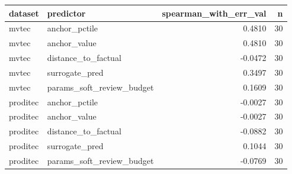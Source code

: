 \begin{tabular}{llrr}
\toprule
 dataset &                 predictor &  spearman\_with\_err\_val &  n \\
\midrule
   mvtec &             anchor\_pctile &                 0.4810 & 30 \\
   mvtec &              anchor\_value &                 0.4810 & 30 \\
   mvtec &       distance\_to\_factual &                -0.0472 & 30 \\
   mvtec &            surrogate\_pred &                 0.3497 & 30 \\
   mvtec & params\_soft\_review\_budget &                 0.1609 & 30 \\
proditec &             anchor\_pctile &                -0.0027 & 30 \\
proditec &              anchor\_value &                -0.0027 & 30 \\
proditec &       distance\_to\_factual &                -0.0882 & 30 \\
proditec &            surrogate\_pred &                 0.1044 & 30 \\
proditec & params\_soft\_review\_budget &                -0.0769 & 30 \\
\bottomrule
\end{tabular}
